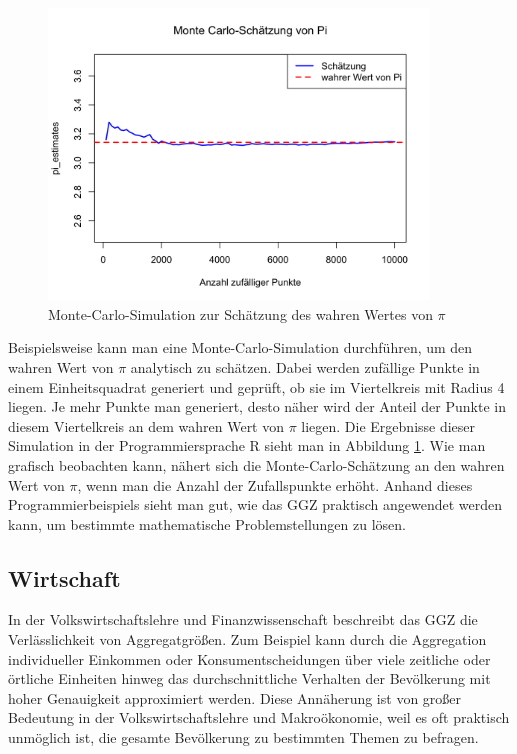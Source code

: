 \documentclass[aodsor,preprint]{imsart}
\numberwithin{equation}{section}
\theoremstyle{plain}
\begin{document}
\begin{figure}[h!]
  \centering
  \includegraphics[width=0.9\textwidth]{Monte_carlo.png}
  \caption{Monte-Carlo-Simulation zur Schätzung des wahren Wertes von \texorpdfstring{$\pi$}{π}}
  \label{fig:monte_carlo}
\end{figure}


Beispielsweise kann man eine Monte-Carlo-Simulation durchführen, um den wahren Wert von \texorpdfstring{$\pi$}{π} analytisch zu schätzen.
Dabei werden zufällige Punkte in einem Einheitsquadrat generiert und geprüft, ob sie im Viertelkreis mit Radius 4 liegen.
Je mehr Punkte man generiert, desto näher wird der Anteil der Punkte in diesem Viertelkreis an dem wahren Wert von \texorpdfstring{$\pi$}{π} liegen.
Die Ergebnisse dieser Simulation in der Programmiersprache R sieht man in Abbildung \ref{fig:monte_carlo}.
Wie man grafisch beobachten kann, nähert sich die Monte-Carlo-Schätzung an den wahren Wert von \texorpdfstring{$\pi$}{π}, wenn man die Anzahl der Zufallspunkte erhöht.
Anhand dieses Programmierbeispiels sieht man gut, wie das GGZ praktisch angewendet werden kann, um bestimmte mathematische Problemstellungen zu lösen.


\subsection{Wirtschaft}


In der Volkswirtschaftslehre und Finanzwissenschaft beschreibt das GGZ die Verlässlichkeit von Aggregatgrößen.
Zum Beispiel kann durch die Aggregation individueller Einkommen oder Konsumentscheidungen über viele zeitliche oder örtliche Einheiten hinweg das durchschnittliche Verhalten der Bevölkerung mit hoher Genauigkeit approximiert werden.
Diese Annäherung ist von großer Bedeutung in der Volkswirtschaftslehre und Makroökonomie, weil es oft praktisch unmöglich ist, die gesamte Bevölkerung zu bestimmten Themen zu befragen.
\end{document}
